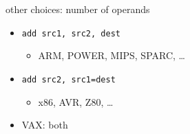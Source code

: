 \begin{frame}[label=ISAChoicesOperands,fragile]{other choices: number of operands}
    \begin{itemize}
        \item \lstinline|add src1, src2, dest|
        \begin{itemize}
            \item ARM, POWER, MIPS, SPARC, \ldots{}
        \end{itemize}
        \item \lstinline|add src2, src1=dest|
        \begin{itemize}
            \item x86, AVR, Z80, \ldots{}
        \end{itemize}
        \item VAX: both
    \end{itemize}
\end{frame}

